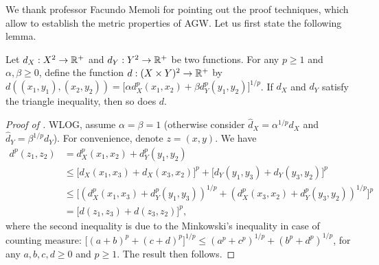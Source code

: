 We thank professor Facundo Memoli for pointing out the proof techniques,
which allow to establish the metric properties of AGW.
Let us first state the following lemma.
\begin{lemma}
    \label{lemma:triangle_ineq}
    Let $d_X: X^2 \to \mathbb R^+$ and $d_Y: Y^2 \to \mathbb R^+$ be two functions.
    For any $p \geq 1$ and $\alpha, \beta \geq 0$, define the function
    $d: (X \times Y)^2 \to \mathbb R^+$ by $d((x_1, y_1), (x_2, y_2)) = \big[ \alpha d^p_X(x_1, x_2) + \beta d^p_Y(y_1, y_2) \big]^{1/p}$.
    If $d_X$ and $d_Y$ satisfy the triangle inequality, then so does $d$.
\end{lemma}
\begin{proof}[Proof of ]
    WLOG, assume $\alpha = \beta = 1$ (otherwise consider
    $\widehat{d}_X = \alpha^{1/p} d_X$ and $\widehat{d}_Y = \beta^{1/p} d_Y$).
    For convenience, denote $z = (x, y)$. We have
    \begin{align}
        d^p(z_1, z_2) &= d^p_X(x_1, x_2) + d^p_Y(y_1, y_2) \\
        &\leq \Big[ d_X(x_1, x_3) + d_X(x_3, x_2) \Big]^p
        + \Big[d_Y(y_1, y_3) + d_Y(y_3, y_2) \Big]^p \\
        &\leq \Big[ (d^p_X(x_1, x_3) + d^p_Y(y_1, y_3))^{1 / p}
        + (d^p_X(x_3, x_2) + d_Y^p(y_3, y_2))^{1/p} \Big]^p \\
        &=\Big[ d(z_1, z_3) + d(z_3, z_2) \Big]^p,
    \end{align}
    where the second inequality is due to the Minkowski's inequality in case of counting measure:
    $\big[ (a + b)^p + (c+d)^p \big]^{1/p} \leq (a^p + c^p)^{1 / p} + (b^p + d^p)^{1/p}$,
    for any $a,b,c,d \geq 0$ and $p \geq 1$. The result then follows.
\end{proof}

